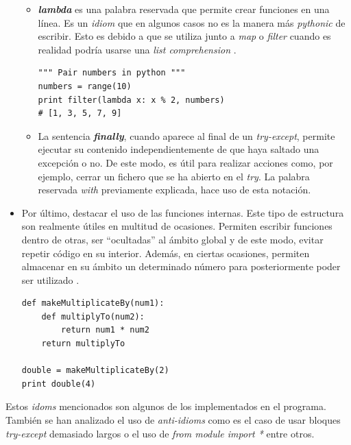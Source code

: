 \documentclass[a4paper, 12pt]{book}
\begin{document}
\begin{itemize}
\begin{itemize}
\item \textbf{\textit{lambda}} es una palabra reservada que permite crear funciones en una línea. Es un \textit{idiom} que en algunos casos no es la manera más \textit{pythonic} de escribir. Esto es debido a que se utiliza junto a \textit{map} o \textit{filter} cuando es realidad podría usarse una \textit{list comprehension} \cite{lambda}.

\begin{verbatim}
""" Pair numbers in python """
numbers = range(10)
print filter(lambda x: x % 2, numbers)
# [1, 3, 5, 7, 9]
\end{verbatim}

\item La sentencia \textbf{\textit{finally}}, cuando aparece al final de un \textit{try-except}, permite ejecutar su contenido independientemente de que haya saltado una excepción o no. De este modo, es útil para realizar acciones como, por ejemplo, cerrar un fichero que se ha abierto en el \textit{try}. La palabra reservada \textit{with} previamente explicada, hace uso de esta notación.

\end{itemize}

\item Por último, destacar el uso de las funciones internas. Este tipo de estructura son realmente útiles en multitud de ocasiones. Permiten escribir funciones dentro de otras, ser ``ocultadas'' al ámbito global y de este modo, evitar repetir código en su interior. Además, en ciertas ocasiones, permiten almacenar en su ámbito un determinado número para posteriormente poder ser utilizado \cite{pep227}. 

\begin{verbatim}
def makeMultiplicateBy(num1):
    def multiplyTo(num2):
        return num1 * num2
    return multiplyTo

double = makeMultiplicateBy(2)
print double(4)
\end{verbatim}

\end{itemize}


Estos \textit{idoms} mencionados son algunos de los implementados en el programa. También se han analizado el uso de \textit{anti-idioms} como es el caso de usar bloques \textit{try-except} demasiado largos o el uso de \textit{from module import *} entre otros.
\end{document}
